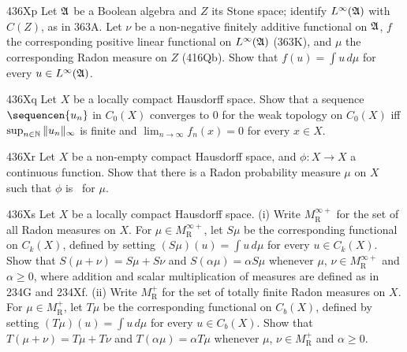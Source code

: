 {\sqheader 436Xp Let $\frak A$ be a Boolean algebra and $Z$ its Stone 
space;  identify $L^{\infty}(\frak A)$ with $C(Z)$, as in 363A.   Let 
$\nu$ be a non-negative finitely additive functional on $\frak A$,  $f$ 
the corresponding positive linear functional on $L^{\infty}(\frak A)$ 
(363K), and $\mu$ the corresponding Radon measure on $Z$ (416Qb).   Show 
that $f(u)=\int u\,d\mu$ for every $u\in L^{\infty}(\frak A)$. 
      
\spheader 436Xq Let $X$ be a locally compact Hausdorff space.   Show 
that a sequence $\sequencen{u_n}$ in $C_0(X)$ converges to $0$ for the 
weak topology on $C_0(X)$ iff $\sup_{n\in\Bbb N}\|u_n\|_{\infty}$ is 
finite and $\lim_{n\to\infty}f_n(x)=0$ for every $x\in X$. 
      
\spheader 436Xr Let $X$ be a non-empty compact Hausdorff space, and 
$\phi:X\to X$ a continuous function.   Show that there is a Radon 
probability measure $\mu$ on $X$ such that 
$\phi$ is \imp\ for $\mu$.    
 
\spheader 436Xs Let $X$ be a locally compact Hausdorff space.    
(i) Write $M^{\infty+}_{\text{R}}$ for the set of all Radon measures on 
$X$.   For $\mu\in M^{\infty+}_{\text{R}}$, let $S\mu$ be the  
corresponding 
functional on $C_k(X)$, defined by setting $(S\mu)(u)=\int u\,d\mu$ for 
every $u\in C_k(X)$.   Show that 
$S(\mu+\nu)=S\mu+S\nu$ and $S(\alpha\mu)=\alpha S\mu$ 
whenever $\mu$, $\nu\in M^{\infty+}_{\text{R}}$ and 
$\alpha\ge 0$, where addition and scalar multiplication of measures 
are defined as in 234G and 234Xf. 
(ii) Write $M^+_{\text{R}}$ for the set of totally finite Radon measures on 
$X$.   For $\mu\in M^+_{\text{R}}$, let $T\mu$ be the  
corresponding 
functional on $C_b(X)$, defined by setting $(T\mu)(u)=\int u\,d\mu$ for 
every $u\in C_b(X)$.   Show that 
$T(\mu+\nu)=T\mu+T\nu$ and $T(\alpha\mu)=\alpha T\mu$ 
whenever $\mu$, $\nu\in M^+_{\text{R}}$ and $\alpha\ge 0$. 
 
}
